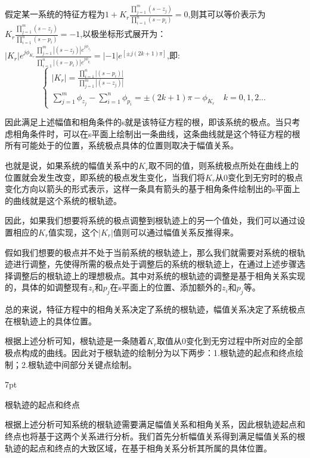 \documentclass{article}
\numberwithin{equation}{section}
\numberwithin{figure}{section}
\newenvironment{formal}{%
\def\FrameCommand{%
\hspace{1pt}%
{\color{DarkBlue}\vrule width 2pt}%
{\color{formalshade}\vrule width 4pt}%
\colorbox{formalshade}%
}%
\MakeFramed{\advance\hsize-\width\FrameRestore}%
\noindent\hspace{-4.55pt}%
\begin{adjustwidth}{}{7pt}%
\vspace{2pt}\vspace{2pt}%
}
{%
\vspace{2pt}\end{adjustwidth}\endMakeFramed%
}
\begin{document}
假定某一系统的特征方程为$1+K_r\frac{\prod_{j=1}^{m}(s-z_j)}{\prod_{i=1}^{n}(s-p_i)}=0$,则其可以等价表示为$K_r\frac{\prod_{j=1}^{m}(s-z_j)}{\prod_{i=1}^{n}(s-p_i)}=-1$,以极坐标形式展开为：$|K_r|e^{j\phi_{K_r}}\frac{\prod_{j=1}^{m}|(s-z_j)|e^{j\phi_{z_j}}}{\prod_{i=1}^{n}|(s-p_i)|e^{j\phi_{p_i}}}=|-1|e^{[±j(2k+1)\pi]}$,即:
\begin{equation}
    \begin{cases}
       |K_r|=\frac{\prod_{i=1}^{n}|(s-p_i)|}{\prod_{j=1}^{m}|(s-z_j)|}\\
       \sum_{j=1}^{m}\phi_{z_j}-\sum_{i=1}^{n}\phi_{p_i}=±(2k+1)\pi - \phi_{K_r} \quad k=0,1,2...
    \end{cases}
\end{equation}

因此满足上述幅值和相角条件的s就是该特征方程的根，即该系统的极点。当只考虑相角条件时，可以在s平面上绘制出一条曲线，这条曲线就是这个特征方程的根所有可能处于的位置，系统极点具体的位置则取决于幅值关系。

也就是说，如果系统的幅值关系中的$K_r$取不同的值，则系统极点所处在曲线上的位置就会发生改变，即系统的极点发生变化，当我们将$K_r$从0变化到无穷时的极点变化方向以箭头的形式表示，这样一条具有箭头的基于相角条件绘制出的s平面上的曲线就是这个系统的根轨迹。

因此，如果我们想要将系统的极点调整到根轨迹上的另一个值处，我们可以通过设置相应的$K_r$值实现，这个$|K_r|$值则可以通过幅值关系反推得来。

假如我们想要的极点并不处于当前系统的根轨迹上，那么我们就需要对系统的根轨迹进行调整，先使得所需的极点处于调整后的系统的根轨迹上，在通过上述步骤选择调整后的根轨迹上的理想极点。其中对系统的根轨迹的调整是基于相角关系实现的，具体的如调整现有$z_i$和$p_j$在s平面上的位置、添加额外的$z_i$和$p_j$等。

总的来说，特征方程中的相角关系决定了系统的根轨迹，幅值关系决定了系统极点在根轨迹上的具体位置。

根据上述分析可知，根轨迹是一条随着$K_r$取值从0变化到无穷过程中所对应的全部极点构成的曲线。因此对于根轨迹的绘制分为以下两步：1.根轨迹的起点和终点绘制；2.根轨迹中间部分关键点绘制。

\begin{formal}
    根轨迹的起点和终点
\end{formal}

根据上述分析可知系统的根轨迹需要满足幅值关系和相角关系，因此根轨迹起点和终点也将基于这两个关系进行分析。我们首先分析幅值关系得到满足幅值关系的根轨迹的起点和终点的大致区域，在基于相角关系分析其所属的具体位置。
\end{document}
